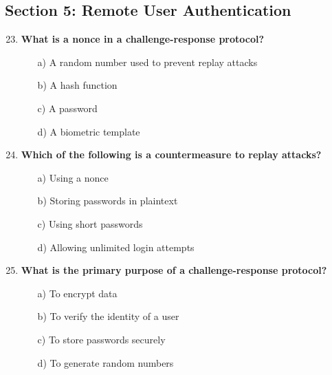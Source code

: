 \documentclass{article}
\begin{document}
\subsection*{Section 5: Remote User Authentication}
\begin{enumerate}
    \setcounter{enumi}{22}
    \item \textbf{What is a nonce in a challenge-response protocol?}
    \begin{itemize}
        \item[a)] A random number used to prevent replay attacks  
        \item[b)] A hash function  
        \item[c)] A password  
        \item[d)] A biometric template  
    \end{itemize}

    \item \textbf{Which of the following is a countermeasure to replay attacks?}
    \begin{itemize}
        \item[a)] Using a nonce  
        \item[b)] Storing passwords in plaintext  
        \item[c)] Using short passwords  
        \item[d)] Allowing unlimited login attempts  
    \end{itemize}

    \item \textbf{What is the primary purpose of a challenge-response protocol?}
    \begin{itemize}
        \item[a)] To encrypt data  
        \item[b)] To verify the identity of a user  
        \item[c)] To store passwords securely  
        \item[d)] To generate random numbers  
    \end{itemize}
\end{enumerate}
\end{document}
